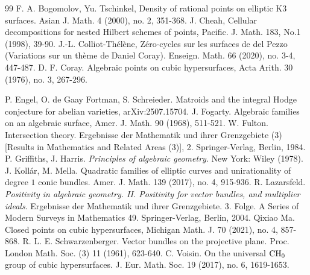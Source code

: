 \documentclass[10pt]{article}
\begin{document}
\begin{thebibliography}{99}
 F. A. Bogomolov, Yu. Tschinkel, Density of rational points on elliptic K3 surfaces.
Asian J. Math. 4 (2000), no. 2, 351-368.
  J. Cheah, Cellular decompositions for nested Hilbert schemes of points, Pacific. J. Math. 183, No.1 (1998), 39-90.
  J.-L. Colliot-Th\'{e}l\`{e}ne,  Z\'{e}ro-cycles sur les surfaces de del Pezzo (Variations sur un th\`{e}me de Daniel Coray).  Enseign. Math. 66 (2020), no. 3-4, 447-487.
 D. F. Coray. Algebraic points on cubic hypersurfaces, Acta Arith. 30 (1976), no. 3,
267-296.

   P. Engel, O. de Gaay Fortman, S. Schreieder. Matroids and the integral Hodge conjecture for abelian varieties, arXiv:2507.15704.
     J. Fogarty. Algebraic families on an algebraic surface,
Amer. J. Math. 90 (1968), 511-521.
     W. Fulton. Intersection theory. Ergebnisse der Mathematik und ihrer Grenzgebiete (3)
[Results in Mathematics and Related Areas (3)], 2. Springer-Verlag, Berlin, 1984.
 P. Griffiths, J. Harris. {\it Principles of algebraic geometry}. New York: Wiley (1978).
 J. Koll\'ar, M. Mella. Quadratic families of elliptic curves and unirationality of
degree $1$ conic bundles. Amer. J. Math. 139 (2017), no. 4, 915-936.
 R. Lazarsfeld. {\it Positivity in algebraic geometry. II. Positivity for vector bundles, and multiplier ideals}. Ergebnisse der Mathematik und ihrer Grenzgebiete. 3. Folge. A Series of Modern Surveys in Mathematics  49. Springer-Verlag, Berlin, 2004.
 Qixiao Ma. Closed points on cubic hypersurfaces, Michigan Math. J. 70 (2021), no. 4, 857-868.
 R. L. E. Schwarzenberger.
Vector bundles on the projective plane.
Proc. London Math. Soc. (3) 11 (1961), 623-640.
 C. Voisin. On the universal ${\rm CH}_0$ group of cubic hypersurfaces. J. Eur. Math. Soc.  19 (2017), no. 6, 1619-1653.
\end{thebibliography}
\end{document}
